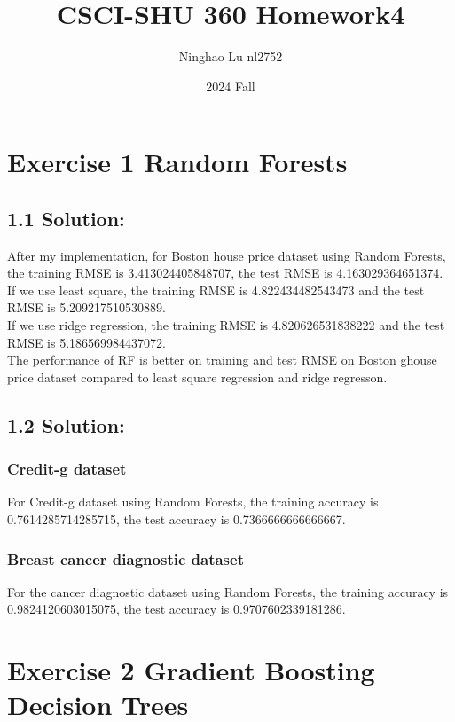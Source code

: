 \documentclass{article}
\title{CSCI-SHU 360 Homework4}
\author{Ninghao Lu nl2752}
\date{2024 Fall}
\begin{document}
\maketitle

\section*{Exercise 1 Random Forests}
\subsection*{1.1 Solution:}
After my implementation, for Boston house price dataset using Random Forests, the training RMSE is 3.413024405848707, the test RMSE is 4.163029364651374.\\
If we use least square, the training RMSE is 4.822434482543473 and the test RMSE is 5.209217510530889.\\
If we use ridge regression, the training RMSE is 4.820626531838222 and the test RMSE is 5.186569984437072.\\
The performance of RF is better on training and test RMSE on Boston ghouse price dataset compared to least square regression and ridge regresson.
\subsection*{1.2 Solution:}
\subsubsection*{Credit-g dataset}
For Credit-g dataset using Random Forests, the training accuracy is 0.7614285714285715, the test accuracy is 0.7366666666666667.

\subsubsection*{Breast cancer diagnostic dataset}
For the cancer diagnostic dataset using Random Forests, the training accuracy is 0.9824120603015075, the test accuracy is 0.9707602339181286.

\section*{Exercise 2 Gradient Boosting Decision Trees}
\end{document}
